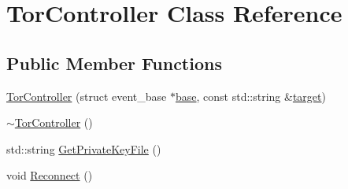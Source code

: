 \hypertarget{class_tor_controller}{}\section{Tor\+Controller Class Reference}
\label{class_tor_controller}
\subsection*{Public Member Functions}
\begin{DoxyCompactItemize}
\item 
\mbox{\hyperlink{class_tor_controller_ab38d90df15a9e3f2c6e1f4f24073a64e}{Tor\+Controller}} (struct event\+\_\+base $\ast$\mbox{\hyperlink{class_tor_controller_a490cb6f1e683bbff4a6da80f054a1f14}{base}}, const std\+::string \&\mbox{\hyperlink{class_tor_controller_ae082deff33f6f1db7e51825113c1adab}{target}})
\item 
\mbox{\hyperlink{class_tor_controller_a98c6b822f4a60da7847a974607b95963}{$\sim$\+Tor\+Controller}} ()
\item 
std\+::string \mbox{\hyperlink{class_tor_controller_a524481ece961670f745dbbfb4d9d5a33}{Get\+Private\+Key\+File}} ()
\item 
void \mbox{\hyperlink{class_tor_controller_ae5d4304836fce79574ec540c5ada8269}{Reconnect}} ()
\end{DoxyCompactItemize}
